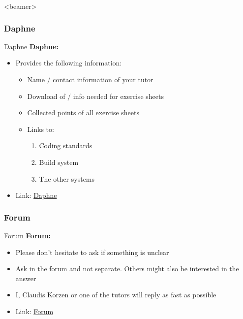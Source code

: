 \begin{frame}<beamer>{\LectureToC}
  \tableofcontents[currentsection, currentsubsection,
    subsubsectionstyle=show/show/shaded
  ]
\end{frame}

\subsubsection{Daphne}

\begin{frame}{Daphne}
  \textbf{Daphne:}
  \begin{itemize}
    \item
      Provides the following information:
      \begin{itemize}
        \item
          Name / contact information of your tutor
        \item
          Download of / info needed for exercise sheets
        \item
          Collected points of all exercise sheets
        \item
          Links to:
          \begin{enumerate}
            \item
              Coding standards
            \item
              Build system
            \item
              The other systems
          \end{enumerate}
      \end{itemize}
    \item
      Link: {\color{Mittel-Blau}\href{\LectureDaphneLink}{Daphne}}
  \end{itemize}
\end{frame}


\subsubsection{Forum}
\begin{frame}{Forum}
  \textbf{Forum:}
  \begin{itemize}
    \item
      Please don't hesitate to ask if something is unclear
    \item
      Ask in the forum and not separate.
      Others might also be interested in the answer
    \item
      {\color{Mittel-Blau}I}, {\color{Mittel-Blau}Claudis Korzen} or one of the
      {\color{Mittel-Blau}tutors} will reply as fast as possible
    \item
      Link: {\color{Mittel-Blau}\href{\LectureForumLink}{Forum}}
  \end{itemize}
\end{frame}

